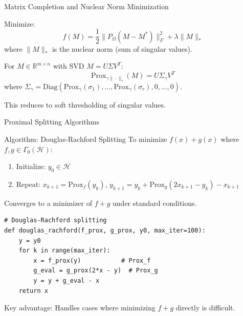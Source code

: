 \documentclass[aspectratio=169,10pt]{beamer}
\begin{document}
\begin{frame}{Matrix Completion and Nuclear Norm Minimization}
\begin{problem}
Minimize:
\[
f(M) = \frac{1}{2}\|P_\Omega(M - M^*)\|_F^2 + \lambda \|M\|_*
\]
where $\|M\|_*$ is the nuclear norm (sum of singular values).
\end{problem}

\vspace{0.3cm}

\begin{solution}
For $M \in \mathbb{R}^{m \times n}$ with SVD $M = U\Sigma V^T$:
\[
\mathrm{Prox}_{\gamma \|\cdot\|_*}(M) = U \Sigma_\gamma V^T
\]
where $\Sigma_\gamma = \mathrm{Diag}(\mathrm{Prox}_\gamma(\sigma_1), \ldots, \mathrm{Prox}_\gamma(\sigma_r), 0, \ldots, 0)$.
\end{solution}

\vspace{0.2cm}

This reduces to soft thresholding of singular values.
\end{frame}

\begin{frame}[fragile]{Proximal Splitting Algorithms}

\begin{exampleblock}{Algorithm: Douglas-Rachford Splitting}
To minimize $f(x) + g(x)$ where $f, g \in \Gamma_0(\mathcal{H})$:
\begin{enumerate}
    \item Initialize: $y_0 \in \mathcal{H}$
    \item Repeat: $x_{k+1} = \mathrm{Prox}_f(y_k)$, \quad $y_{k+1} = y_k + \mathrm{Prox}_g(2x_{k+1} - y_k) - x_{k+1}$
\end{enumerate}
Converges to a minimizer of $f + g$ under standard conditions.
\end{exampleblock}

\vspace{0.3cm}

\begin{lstlisting}
# Douglas-Rachford splitting
def douglas_rachford(f_prox, g_prox, y0, max_iter=100):
    y = y0
    for k in range(max_iter):
        x = f_prox(y)           # Prox_f
        g_eval = g_prox(2*x - y)  # Prox_g
        y = y + g_eval - x
    return x
\end{lstlisting}

\vspace{0.2cm}

Key advantage: Handles cases where minimizing $f + g$ directly is difficult.
\end{frame}
\end{document}
